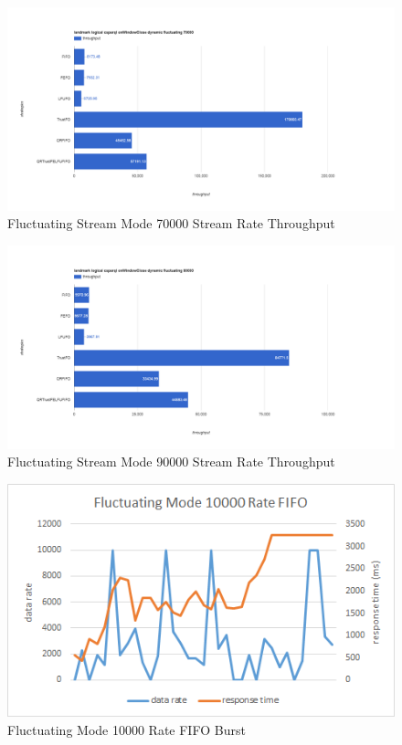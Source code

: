\begin{figure}[!htbp]
    \centering
    \includegraphics[width=\textwidth]{img/app3-f-70000-t.png}
    \caption{Fluctuating Stream Mode 70000 Stream Rate Throughput}
\end{figure}
\begin{figure}[!htbp]
    \centering
    \includegraphics[width=\textwidth]{img/app3-f-90000-t.png}
    \caption{Fluctuating Stream Mode 90000 Stream Rate Throughput}
\end{figure}
\begin{figure}[!htbp]
	\centering
	\includegraphics[width=\textwidth]{img/app3-f-10000-fifo.png}
	\caption{Fluctuating Mode 10000 Rate FIFO Burst}
\end{figure}
